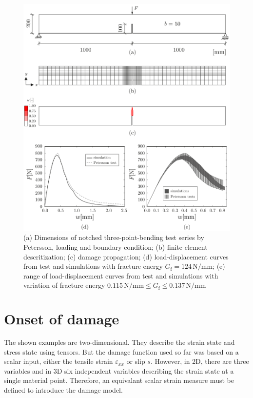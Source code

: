 \documentclass[main.tex]{subfiles}
\begin{document}
\begin{figure}
\centering
\includegraphics[width=13cm]{fig/3pb-pet.pdf}
\caption{(a) Dimensions of notched three-point-bending test series by Petersson, loading and boundary condition; (b) finite element descritization; (c) damage propagation; (d) load-displacement curves from test and simulations with fracture energy $G_\mathrm{f} = 124\,\mathrm{N/mm}$; (e) range of load-displacement curves from test and simulations with variation of fracture energy $0.115\,\mathrm{N/mm} \leq G_\mathrm{f} \leq 0.137\,\mathrm{N/mm}$}
\label{FIGpet1}
\end{figure}

\section{Onset of damage}
\label{sec:equivalent_strain}
The shown examples are two-dimensional. They describe the strain state and stress state using tensors. 
But the damage function used so far was based on a scalar input, either the tensile strain $\varepsilon_{xx}$ or slip $s$. However, in 2D, there are three variables and in 3D six independent variables describing the strain state at a single material point. Therefore, an equivalant scalar strain measure must be defined to introduce the damage model.  
\end{document}
